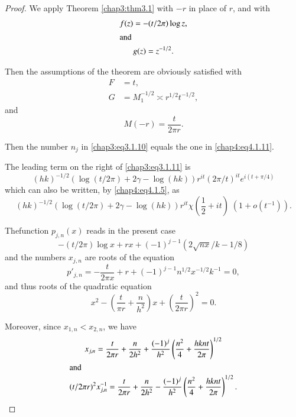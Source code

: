 \begin{proof}
We apply Theorem \ref{chap3:thm3.1} with $-r$ in place of $r$, and
with 
\begin{gather}
f(z)=-(t/2\pi)\log z,\label{chap4:eq4.1.13}\\
\intertext{and}
g(z)=z^{-1/2}.\label{chap4:eq4.1.14}
\end{gather}

Then the assumptions of the theorem are obviously satisfied with 
\begin{align}
F&=t,\label{chap4:eq4.1.15}\\
G&=M_1^{-1/2}\asymp r^{1/2}t^{-1/2},\label{chap4:eq4.1.16}
\end{align}
and 
\begin{equation}\label{chap4:eq4.1.17}
M(-r)=\frac{t}{2\pi r}.
\end{equation}

Then the number $n_j$ in \eqref{chap3:eq3.1.10} equals the one in
\eqref{chap4:eq4.1.11}.

The leading term on the right of \eqref{chap3:eq3.1.11} is
$$
(hk)^{-1/2}(\log(t/2\pi)+2\gamma-\log(hk))r^{it}(2\pi/t)^{it}
e^{i(t+\pi/4)}
$$
which can also be written, by \eqref{chap4:eq4.1.5}, as 
\begin{equation}\label{chap4:eq4.1.18}
(hk)^{-1/2}(\log(t/2\pi)+2\gamma-\log(hk))r^{it}\chi\left(\frac{1}{2}
+it\right)\; \left(1+o\left(t^{-1}\right)\right).
\end{equation}

The\pageoriginale function $p_{j,n}(x)$ reads in the present case
\begin{equation}\label{chap4:eq4.1.19}
-(t/2\pi)\log x+rx+(-1)^{j-1}\left(2\sqrt{nx}/k-1/8\right)
\end{equation}
and the numbers $x_{j,n}$ are roots of the equation
\begin{equation}\label{chap4:eq4.1.20}
p'_{j,n}=-\frac{t}{2\pi x}+r+(-1)^{j-1}n^{1/2}x^{-1/2}k^{-1}=0,
\end{equation}
and thus roots of the quadratic equation
\begin{equation}\label{chap4:eq4.1.21}
x^2-\left(\frac{t}{\pi r}+\frac{n}{h^2}\right)x+\left(\frac{t} {2\pi
r}\right)^2=0.
\end{equation}

Moreover, since $x_{1,n}<x_{2,n}$, we have 
\begin{gather}
x_{j,n}=\frac{t}{2\pi r}+\frac{n}{2h^2}+\frac{(-1)^j}{h^2}\left(
\frac{n^2}{4}+\frac{hknt}{2\pi}\right)^{1/2}\label{chap4:eq4.1.22}\\
\intertext{and}
(t/2\pi r)^2x_{j,n}^{-1}=\frac{t}{2\pi r}+\frac{n}{2h^2}-\frac{(-1)^j}
{h^2}\left(\frac{n^2}{4}+\frac{hknt}{2\pi}
\right)^{1/2}.\label{chap4:eq4.1.23}
\end{gather}


\end{proof}
